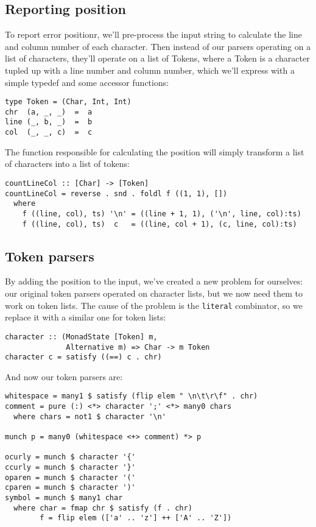 \documentclass{tmr}
\begin{document}
\subsection{Reporting position}
To report error positionr, we'll pre-process the input
string to calculate the line and column number of each character.  Then instead 
of our parsers operating on a list of characters, they'll operate on a list of 
Tokens, where a Token is a character tupled up with a line number and column 
number, which we'll express with a simple typedef and some accessor functions:
\begin{verbatim}
type Token = (Char, Int, Int)
chr  (a, _, _)  =  a
line (_, b, _)  =  b
col  (_, _, c)  =  c
\end{verbatim}
The function responsible for calculating the position will simply transform a 
list of characters into a list of tokens:
\begin{verbatim}
countLineCol :: [Char] -> [Token]
countLineCol = reverse . snd . foldl f ((1, 1), [])
  where
    f ((line, col), ts) '\n' = ((line + 1, 1), ('\n', line, col):ts)
    f ((line, col), ts)  c   = ((line, col + 1), (c, line, col):ts)
\end{verbatim}

\subsection{Token parsers}
By adding the position to the input, we've created a new problem 
for ourselves: our original token parsers operated on 
character lists, but we now need them to work on token lists.  
The cause of the problem is the \verb+literal+ combinator, so we
replace it with a similar one for token lists:
\begin{verbatim}
character :: (MonadState [Token] m, 
              Alternative m) => Char -> m Token
character c = satisfy ((==) c . chr)
\end{verbatim}

And now our token parsers are:
\begin{verbatim}
whitespace = many1 $ satisfy (flip elem " \n\t\r\f" . chr)
comment = pure (:) <*> character ';' <*> many0 chars
  where chars = not1 $ character '\n'

munch p = many0 (whitespace <+> comment) *> p

ocurly = munch $ character '{'
ccurly = munch $ character '}'
oparen = munch $ character '('
cparen = munch $ character ')'
symbol = munch $ many1 char
  where char = fmap chr $ satisfy (f . chr)
        f = flip elem (['a' .. 'z'] ++ ['A' .. 'Z'])
\end{verbatim}
\end{document}
